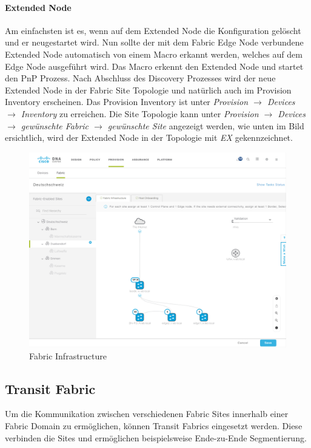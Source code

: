 \paragraph{Extended Node}
Am einfachsten ist es, wenn auf dem Extended Node die Konfiguration gelöscht und er neugestartet wird. Nun sollte der mit dem Fabric Edge Node verbundene Extended Node automatisch von einem Macro erkannt werden, welches auf dem Edge Node ausgeführt wird. Das Macro erkennt den Extended Node und startet den PnP Prozess. Nach Abschluss des Discovery Prozesses wird der neue Extended Node in der Fabric Site Topologie und natürlich auch im Provision Inventory erscheinen. Das Provision Inventory ist unter \textit{Provision $\rightarrow$ Devices $\rightarrow$ Inventory} zu erreichen. Die Site Topologie kann unter \textit{Provision $\rightarrow$ Devices $\rightarrow$ gewünschte Fabric $\rightarrow$ gewünschte Site} angezeigt werden, wie unten im Bild ersichtlich, wird der Extended Node in der Topologie mit \textit{EX} gekennzeichnet.

\begin{figure}[H]
	\centering
	\includegraphics[width=1\linewidth]{img/Absicherung/ExtendedNode4}
	\caption{Fabric Infrastructure}
	\label{fig:Fabric Infrastructure}
\end{figure}

\subsection{Transit Fabric}

Um die Kommunikation zwischen verschiedenen Fabric Sites innerhalb einer Fabric Domain zu ermöglichen, können Transit Fabrics eingesetzt werden. Diese verbinden die Sites und ermöglichen beispielsweise Ende-zu-Ende Segmentierung.

